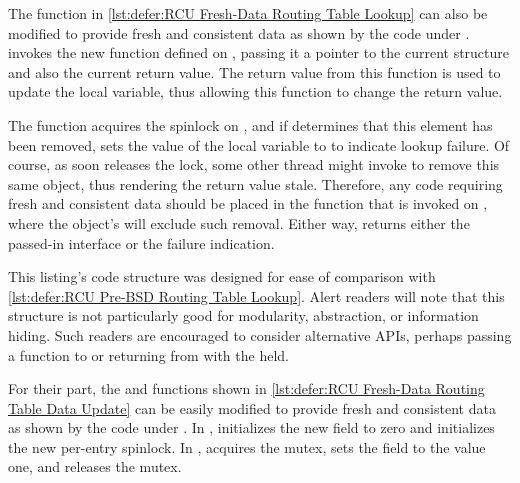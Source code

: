 \begin{fcvref}
The  function in
\cref{lst:defer:RCU Fresh-Data Routing Table Lookup}
can also be modified to provide fresh and consistent data as shown by
the code under .
 invokes the new  function
defined on , passing it a pointer to the
current  structure and also the current return value.
The return value from this function is used to update the 
local variable, thus allowing this function to change the return value.

The  function acquires the spinlock on
, and if  determines that this element
has been removed,  sets the value of the local
variable  to  to indicate lookup failure.
Of course, as soon  releases the lock, some other thread
might invoke  to remove this same object, thus rendering
the return value stale.
Therefore, any code requiring fresh and consistent data should be
placed in the  function that is invoked on
, where the object's  will exclude
such removal.
Either way,  returns either the passed-in interface or
the failure indication.

This listing's code structure was designed for ease of comparison with
\cref{lst:defer:RCU Pre-BSD Routing Table Lookup}.
Alert readers will note that this structure is not particularly good
for modularity, abstraction, or information hiding.
Such readers are encouraged to consider alternative APIs, perhaps passing
a function to  or returning from 
with the  held.
\end{fcvref}

\begin{listing}

\caption{RCU Fresh-Data Routing Table Data Update}
\label{lst:defer:RCU Fresh-Data Routing Table Data Update}
\end{listing}

\begin{fcvref}
For their part, the  and  functions
shown in
\cref{lst:defer:RCU Fresh-Data Routing Table Data Update}
can be easily modified to provide fresh and consistent data as shown by
the code under .
In ,  initializes the new 
field to zero and  initializes the new per-entry spinlock.
In ,  acquires the mutex, 
sets the  field to the value one, and 
releases the mutex.
\end{fcvref}

